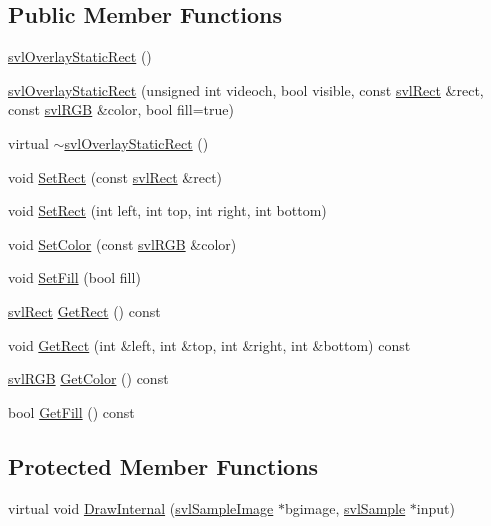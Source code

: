 \subsection*{Public Member Functions}
\begin{DoxyCompactItemize}
\item 
\hyperlink{classsvl_overlay_static_rect_ae91b11cd992ad04fa407f4ecadae7f56}{svl\-Overlay\-Static\-Rect} ()
\item 
\hyperlink{classsvl_overlay_static_rect_ae94a36da4e9d1ab24c1ffa94e637924b}{svl\-Overlay\-Static\-Rect} (unsigned int videoch, bool visible, const \hyperlink{structsvl_rect}{svl\-Rect} \&rect, const \hyperlink{structsvl_r_g_b}{svl\-R\-G\-B} \&color, bool fill=true)
\item 
virtual \hyperlink{classsvl_overlay_static_rect_a7369b65a5b1b92bc239917d9f57ebdb7}{$\sim$svl\-Overlay\-Static\-Rect} ()
\item 
void \hyperlink{classsvl_overlay_static_rect_a8ab4667a07aa9f2c26a50b28f3425ff4}{Set\-Rect} (const \hyperlink{structsvl_rect}{svl\-Rect} \&rect)
\item 
void \hyperlink{classsvl_overlay_static_rect_a5ae889711bfcec494cea4447caeebf26}{Set\-Rect} (int left, int top, int right, int bottom)
\item 
void \hyperlink{classsvl_overlay_static_rect_adc4f4ff79cc67a4a2378583df635928f}{Set\-Color} (const \hyperlink{structsvl_r_g_b}{svl\-R\-G\-B} \&color)
\item 
void \hyperlink{classsvl_overlay_static_rect_a5676e799b53a8416e67cfe0b262ee706}{Set\-Fill} (bool fill)
\item 
\hyperlink{structsvl_rect}{svl\-Rect} \hyperlink{classsvl_overlay_static_rect_a622702879d0a14e1dd167093c5e65454}{Get\-Rect} () const 
\item 
void \hyperlink{classsvl_overlay_static_rect_a2cf3e7be41151471f313f733146dd0cd}{Get\-Rect} (int \&left, int \&top, int \&right, int \&bottom) const 
\item 
\hyperlink{structsvl_r_g_b}{svl\-R\-G\-B} \hyperlink{classsvl_overlay_static_rect_aa863745fd6a47df7f841def3dba42467}{Get\-Color} () const 
\item 
bool \hyperlink{classsvl_overlay_static_rect_af3d3dfb4c83f05fad0ee38c18eed6444}{Get\-Fill} () const 
\end{DoxyCompactItemize}
\subsection*{Protected Member Functions}
\begin{DoxyCompactItemize}
\item 
virtual void \hyperlink{classsvl_overlay_static_rect_a01636348c731053ab293b562385a7c07}{Draw\-Internal} (\hyperlink{classsvl_sample_image}{svl\-Sample\-Image} $\ast$bgimage, \hyperlink{classsvl_sample}{svl\-Sample} $\ast$input)
\end{DoxyCompactItemize}
